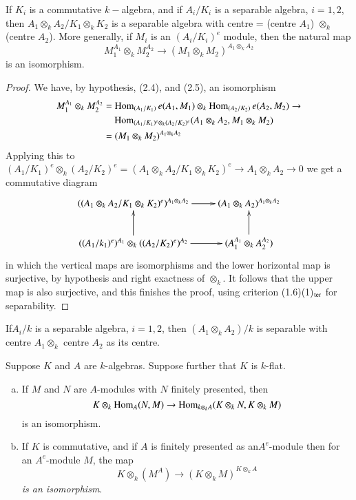 \setcounter{coro}{5}
\begin{coro} %
If $K_i$ is a commutative $k-$algebra, and if $A_i /K_i$ is a
separable algebra, $i = 1, 2$, then $A_1 \otimes_k A_2 / K_1
\otimes_k K_2$ is a separable\pageoriginale
 algebra with centre = (centre $A_1$)
$\otimes_k $ (centre $A_2$). More generally, if $M_i$ is an $(A_i /
K_i)^e$ module, then the natural map 
$$
M^{A_1}_1 \otimes_k M^{A_2}_2 \to (M_1 \otimes_k M_2)^{A_1 \otimes_k
  A_2} 
$$
is an isomorphism.
\end{coro}

\begin{proof}
We have, by hypothesis, (2.4), and (2.5), an isomorphism 
\begin{align*}
M^{A_1}_1 \otimes_k M^{A_2}_2 & = \operatorname{Hom}_{(A_1/K_1)} e(A_1, M_1) \otimes_k
\operatorname{Hom}_{(A_2/K_2)} e(A_2, M_2) \to \\
&\quad \operatorname{Hom}_{(A_1 /K_1)^e \otimes_k (A_2 /
K_2)^e} (A_1 \otimes_k A_2, M_1 \otimes_k M_2)\\
& = (M_1 \otimes_k
M_2)^{A_1 \otimes_k A_2} 
\end{align*}
 Applying this to $(A_1 /K_1)^e \otimes_k (A_2 / K_2)^e = (A_1
 \otimes_k A_2/K_1 \otimes_k K_2)^e \to A_1 \otimes_k A_2 \to 0$ we get
 a commutative diagram	 
\[
\xymatrix{
((A_1 \otimes_k A_2/ K_1 \otimes_k K_2)^e)^{A_1 \otimes_k A_2} \ar[r]
  & (A_1 \otimes_k A_2)^{A_1 \otimes_k A_2} \\
((A_1/k_1)^e)^{A_1} \otimes_k ((A_2/K_2)^e)^{A_2} \ar[r] \ar[u] & (A^{A_1}_1
  \otimes_k A^{A_2}_2) \ar[u]
}
\]
in which the vertical maps are isomorphisms and the lower horizontal
map is surjective, by hypothesis and right exactness of
$\otimes_k$. It follows that the upper map is also surjective, and
this finishes the proof, using criterion (1.6)(1)$_{\rm ter}$ for
separability. 
\end{proof}


\begin{coro} %
If\pageoriginale $A_i / k$ is a separable algebra, $i =1, 2$, then
$(A_1 \otimes_k A_2)/k$ is separable with centre $A_1 \otimes_k$
centre $A_2$ as its centre.  
\end{coro}

\begin{coro} %
Suppose $K$ and $A$ are $k$-algebras. Suppose further that $K$ is
$k$-flat. 
\begin{enumerate}[(a)]
\item If $M$ and $N$ are $A$-modules with $N$ finitely presented, then 
$$
K \otimes_k \operatorname{Hom}_A (N, M) \to \operatorname{Hom}_{k \otimes_{k} A}(K \otimes_k N, K
\otimes_k M) 
$$
is an isomorphism.

\item If $K$ is commutative, and if $A$ is finitely presented as
  an$A^e$-module then for an $A^e$-module $M$, the map 
$$
K \otimes_k (M^A) \to (K \otimes_k M)^{K \otimes_k A}  
$$
\textit{is an isomorphism}.
\end{enumerate}
\end{coro}

